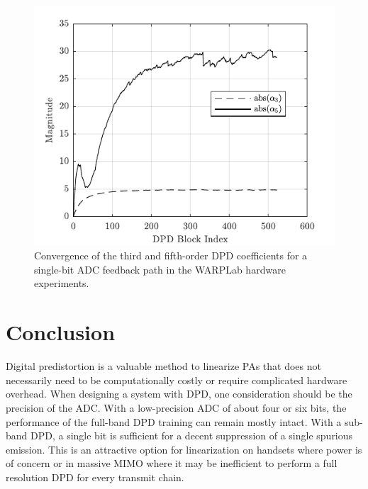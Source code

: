 \documentclass[conference]{IEEEtran}
\begin{document}
\begin{figure}[]
	\centering
	\includegraphics{SubBandConWARP}
	\caption{Convergence of the third and fifth-order DPD coefficients for a single-bit ADC feedback path in the WARPLab hardware experiments.}
	\label{WARPCon}
\end{figure}


\section{Conclusion}
Digital predistortion is a valuable method to linearize PAs that does not necessarily need to be computationally costly or require complicated hardware overhead. 
When designing a system with DPD, one consideration should be the precision of the ADC. 
With a low-precision ADC of about four or six bits, the performance of the full-band DPD training can remain mostly intact.
With a sub-band DPD, a single bit is sufficient for a decent suppression of a single spurious emission. This is an attractive option for linearization on handsets where power is of concern or in massive MIMO where it may be inefficient to perform a full resolution DPD for every transmit chain.




%





\end{document}
